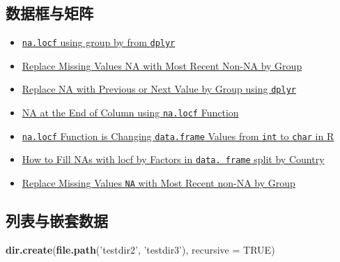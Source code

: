 \documentclass[]{book}
\newenvironment{Shaded}{\begin{snugshade}}{\end{snugshade}}
\newcommand{\KeywordTok}[1]{\textcolor[rgb]{0.13,0.29,0.53}{\textbf{#1}}}
\newcommand{\DataTypeTok}[1]{\textcolor[rgb]{0.13,0.29,0.53}{#1}}
\newcommand{\StringTok}[1]{\textcolor[rgb]{0.31,0.60,0.02}{#1}}
\newcommand{\OtherTok}[1]{\textcolor[rgb]{0.56,0.35,0.01}{#1}}
\newcommand{\NormalTok}[1]{#1}
\providecommand{\tightlist}{%
  \setlength{\itemsep}{0pt}\setlength{\parskip}{0pt}}
\begin{document}
\subsection{数据框与矩阵}

\begin{itemize}
\tightlist
\item
  \href{https://stackoverflow.com/questions/43212308/na-locf-using-group-by-from-dplyr}{\texttt{na.locf}
  using group by from \texttt{dplyr}}
\item
  \href{https://stackoverflow.com/questions/23340150/replace-missing-values-na-with-most-recent-non-na-by-group}{Replace
  Missing Values NA with Most Recent Non-NA by Group}
\item
  \href{https://stackoverflow.com/questions/40040834/replace-na-with-previous-or-next-value-by-group-using-dplyr/40041172}{Replace
  NA with Previous or Next Value by Group using \texttt{dplyr}}
\item
  \href{https://stackoverflow.com/questions/47242643/na-at-the-end-of-column-using-na-locf-function}{NA
  at the End of Column using \texttt{na.locf} Function}
\item
  \href{https://stackoverflow.com/questions/49578085/na-locf-function-is-changing-data-frame-values-from-int-to-char-in-r}{\texttt{na.locf}
  Function is Changing \texttt{data.frame} Values from \texttt{int} to
  \texttt{char} in R}
\item
  \href{https://stackoverflow.com/questions/13616965/how-to-fill-nas-with-locf-by-factors-in-data-frame-split-by-country}{How
  to Fill NAs with locf by Factors in \texttt{data.\ frame} split by
  Country}
\item
  \href{https://stackoverflow.com/questions/23340150/replace-missing-values-na-with-most-recent-non-na-by-group}{Replace
  Missing Values \texttt{NA} with Most Recent non-NA by Group}
\end{itemize}

\subsection{列表与嵌套数据}

\begin{Shaded}
\begin{Highlighting}[]
\KeywordTok{dir.create}\NormalTok{(}\KeywordTok{file.path}\NormalTok{(}\StringTok{'testdir2'}\NormalTok{, }\StringTok{'testdir3'}\NormalTok{), }\DataTypeTok{recursive =} \OtherTok{TRUE}\NormalTok{)}
\end{Highlighting}
\end{Shaded}
\end{document}
